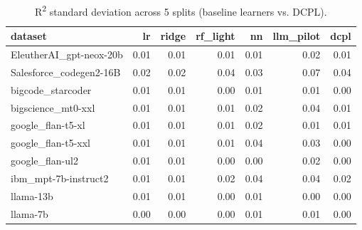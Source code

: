 \begin{table}
\caption{R\textsuperscript{2} standard deviation across 5 splits (baseline learners vs. DCPL).}
\label{tab:r2_std_baseline_vs_dcpl}
\begin{tabular}{lrrrrrr}
\toprule
dataset & lr & ridge & rf\_light & nn & llm\_pilot & dcpl \\
\midrule
EleutherAI\_gpt-neox-20b & 0.01 & 0.01 & 0.01 & 0.01 & 0.02 & 0.01 \\
Salesforce\_codegen2-16B & 0.02 & 0.02 & 0.04 & 0.03 & 0.07 & 0.04 \\
bigcode\_starcoder & 0.01 & 0.01 & 0.00 & 0.01 & 0.01 & 0.00 \\
bigscience\_mt0-xxl & 0.01 & 0.01 & 0.01 & 0.02 & 0.04 & 0.01 \\
google\_flan-t5-xl & 0.01 & 0.01 & 0.01 & 0.02 & 0.01 & 0.01 \\
google\_flan-t5-xxl & 0.01 & 0.01 & 0.01 & 0.04 & 0.03 & 0.00 \\
google\_flan-ul2 & 0.01 & 0.01 & 0.00 & 0.00 & 0.02 & 0.00 \\
ibm\_mpt-7b-instruct2 & 0.01 & 0.01 & 0.02 & 0.04 & 0.04 & 0.02 \\
llama-13b & 0.01 & 0.01 & 0.00 & 0.01 & 0.00 & 0.00 \\
llama-7b & 0.00 & 0.00 & 0.00 & 0.01 & 0.01 & 0.00 \\
\bottomrule
\end{tabular}
\end{table}
